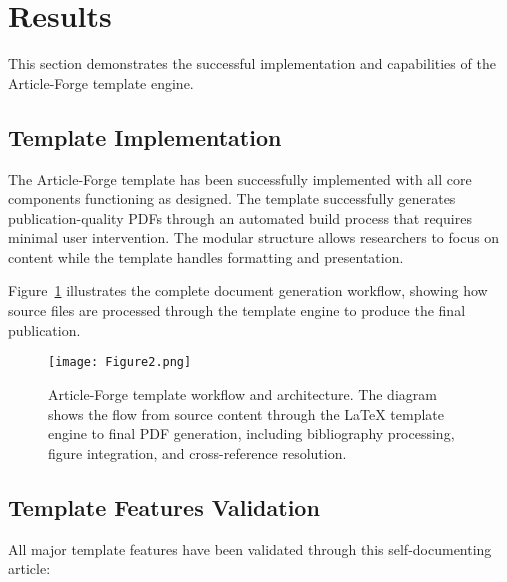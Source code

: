 \section{Results}

This section demonstrates the successful implementation and capabilities of the Article-Forge template engine.

\subsection{Template Implementation}

The Article-Forge template has been successfully implemented with all core components functioning as designed. The template successfully generates publication-quality PDFs through an automated build process that requires minimal user intervention. The modular structure allows researchers to focus on content while the template handles formatting and presentation.

Figure~\ref{fig:results1} illustrates the complete document generation workflow, showing how source files are processed through the template engine to produce the final publication.

\begin{figure}[htbp]
    \centering
    \texttt{[image: Figure2.png]}
    \caption{Article-Forge template workflow and architecture. The diagram shows the flow from source content through the LaTeX template engine to final PDF generation, including bibliography processing, figure integration, and cross-reference resolution.}
    \label{fig:results1}
\end{figure}

\subsection{Template Features Validation}

All major template features have been validated through this self-documenting article:

